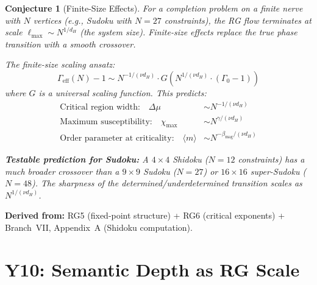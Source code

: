 \documentclass[11pt,letterpaper]{article}
\newtheorem{conjecture}{Conjecture}[section]
\begin{document}
\begin{conjecture}[Finite-Size 
Effects]\label{conj:finite_size}
For a completion problem on a finite nerve with $N$ vertices 
(e.g., Sudoku with $N = 27$ constraints), the RG flow terminates 
at scale $\ell_{\max} \sim N^{1/d_H}$ (the system size). 
Finite-size effects replace the true phase transition with a 
smooth crossover.

The \emph{finite-size scaling ansatz}:
\begin{equation}\label{eq:fss}
    \Gamma_{\mathrm{eff}}(N) - 1 
    \sim N^{-1/(\nu d_H)} \cdot 
    G\!\left(N^{1/(\nu d_H)} \cdot (\Gamma_0 - 1)\right)
\end{equation}
where $G$ is a universal scaling function. This predicts:
\begin{align}
    \text{Critical region width:}\quad 
    \Delta\mu &\sim N^{-1/(\nu d_H)} 
    \label{eq:fss_width}\\
    \text{Maximum susceptibility:}\quad 
    \chi_{\max} &\sim N^{\gamma/(\nu d_H)} 
    \label{eq:fss_chi}\\
    \text{Order parameter at criticality:}\quad 
    \langle m \rangle &\sim N^{-\beta_{\mathrm{mag}}/(\nu d_H)} 
    \label{eq:fss_m}
\end{align}

\textbf{Testable prediction for Sudoku:} A $4 \times 4$ Shidoku 
($N = 12$ constraints) has a much broader crossover than a 
$9 \times 9$ Sudoku ($N = 27$) or $16 \times 16$ super-Sudoku 
($N = 48$). The sharpness of the determined/underdetermined 
transition scales as $N^{1/(\nu d_H)}$.
\end{conjecture}

\textbf{Derived from:} RG5 (fixed-point structure) + RG6 (critical 
exponents) + Branch~VII, Appendix~A (Shidoku computation).

\section{Y10: Semantic Depth as RG Scale}
\end{document}
